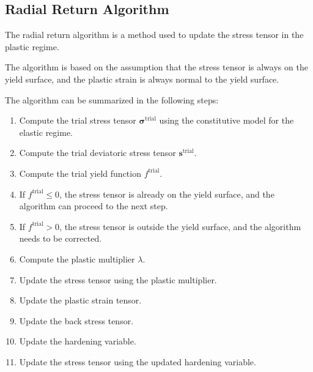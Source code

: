 \subsection{Radial Return Algorithm}
\label{subsec:radial_return_algorithm}

The radial return algorithm is a method used to update the stress tensor in the plastic regime.

The algorithm is based on the assumption that the stress tensor is always on the yield surface, and the plastic strain is always normal to the yield surface.

The algorithm can be summarized in the following steps:

\begin{enumerate}
    \item Compute the trial stress tensor $\boldsymbol{\sigma}^{\text{trial}}$ using the constitutive model for the elastic regime.
    \item Compute the trial deviatoric stress tensor $\boldsymbol{s}^{\text{trial}}$.
    \item Compute the trial yield function $f^{\text{trial}}$.
    \item If $f^{\text{trial}} \leq 0$, the stress tensor is already on the yield surface, and the algorithm can proceed to the next step.
    \item If $f^{\text{trial}} > 0$, the stress tensor is outside the yield surface, and the algorithm needs to be corrected.
    \item Compute the plastic multiplier $\lambda$.
    \item Update the stress tensor using the plastic multiplier.
    \item Update the plastic strain tensor.
    \item Update the back stress tensor.
    \item Update the hardening variable.
    \item Update the stress tensor using the updated hardening variable.
\end{enumerate}